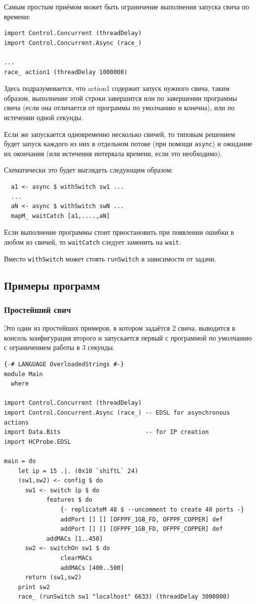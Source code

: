 \documentclass[9pt,a4paper]{article}
\begin{document}
Самым простым приёмом может быть ограничение выполнения запуска свича по времени:

\begin{lstlisting}
import Control.Concurrent (threadDelay)
import Control.Concurrent.Async (race_)

...
race_ action1 (threadDelay 1000000)
\end{lstlisting}

Здесь подразумевается, что action1 содержит запуск нужного свича, таким образом,
выполнение этой строки завершится или по завершении программы свича (если она
отличается от программы по умолчанию и конечна), или по истечении одной секунды.

Если же запускается одновременно несколько свичей, то типовым решением будет
запуск каждого из них в отдельном потоке (при помощи \lstinline!async!) и ожидание
их окончания (или истечения интервала времени, если это необходимо).

Схематически это будет выглядеть следующим образом:

\begin{lstlisting}
  a1 <- async $ withSwitch sw1 ...
  ...
  aN <- async $ withSwitch swN ...
  mapM_ waitCatch [a1,....,aN]
\end{lstlisting}

Если выполнение программы стоит приостановить при появлении ошибки в любом из
свичей, то \lstinline!waitCatch! следует заменить на \lstinline!wait!.

Вместо \lstinline!withSwitch! может стоять \lstinline!runSwitch!
в зависимости от задачи.

\subsection{Примеры программ}

\subsubsection{Простейший свич}

Это один из простейших примеров, в котором задаётся 2 свича,
выводится в консоль конфигурация второго и запускается
первый с программой по умолчанию с ограничением работы
в 3 секунды.

\begin{lstlisting}
{-# LANGUAGE OverloadedStrings #-}
module Main
  where

import Control.Concurrent (threadDelay)
import Control.Concurrent.Async (race_) -- EDSL for asynchronous actions
import Data.Bits                        -- for IP creation
import HCProbe.EDSL

main = do 
    let ip = 15 .|. (0x10 `shiftL` 24)
    (sw1,sw2) <- config $ do
      sw1 <- switch ip $ do
            features $ do
                {- replicateM 48 $ --uncomment to create 48 ports -}
                addPort [] [] [OFPPF_1GB_FD, OFPPF_COPPER] def
                addPort [] [] [OFPPF_1GB_FD, OFPPF_COPPER] def
            addMACs [1..450]
      sw2 <- switchOn sw1 $ do
                clearMACs 
                addMACs [400..500]
      return (sw1,sw2)
    print sw2
    race_ (runSwitch sw1 "localhost" 6633) (threadDelay 3000000)
\end{lstlisting}
\end{document}

